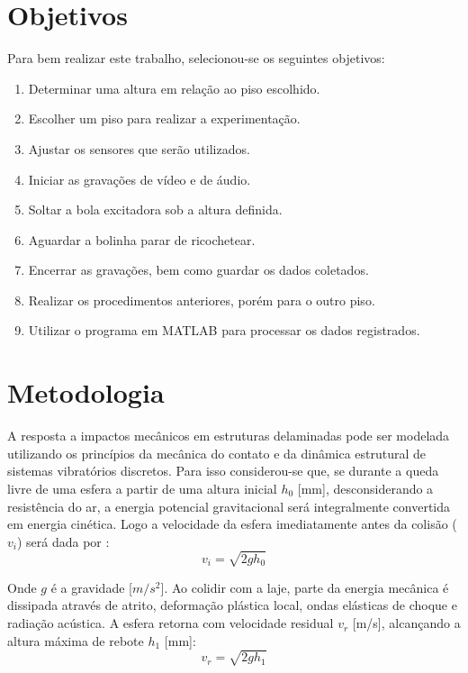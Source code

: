 \documentclass[10pt,twocolumn,fleqn]{article}
\begin{document}
	\section{Objetivos}
	
		Para bem realizar este trabalho, selecionou-se os seguintes objetivos:
	
\begin{enumerate}[label=\arabic*), noitemsep]
	\item Determinar uma altura em relação ao piso escolhido.
	\item Escolher um piso para realizar a experimentação.
	\item Ajustar os sensores que serão utilizados.
	\item Iniciar as gravações de vídeo e de áudio.
	\item Soltar a bola excitadora sob a altura definida.
	\item Aguardar a bolinha parar de ricochetear.
	\item Encerrar as gravações, bem como guardar os dados coletados.
	\item Realizar os procedimentos anteriores, porém para o outro piso.
	\item Utilizar o programa em MATLAB para processar os dados registrados.
\end{enumerate}
	
	\section{Metodologia}
	
	A resposta a impactos mecânicos em estruturas delaminadas pode ser modelada utilizando os princípios da mecânica do contato e da dinâmica estrutural de sistemas vibratórios discretos. Para isso considerou-se que, se durante a queda livre de uma esfera a partir de uma altura inicial $h_0$ [mm], desconsiderando a resistência do ar, a energia potencial gravitacional será integralmente convertida em energia cinética. Logo a velocidade da esfera imediatamente antes da colisão ($v_i$) será dada por \cite{rao2008vibracoes}:
	\begin{equation}
	v_i = \sqrt{2gh_{0}}
	\end{equation}
	
	Onde $g$ é a gravidade [$m/s^{2}$]. Ao colidir com a laje, parte da energia mecânica é dissipada através de atrito, deformação plástica local, ondas elásticas de choque e radiação acústica. A esfera retorna com velocidade residual $v_r$ [m/s], alcançando a altura máxima de rebote $h_1$ [mm]:
	\begin{equation}
	v_r = \sqrt{2gh_{1}}
	\end{equation}
	
\end{document}
